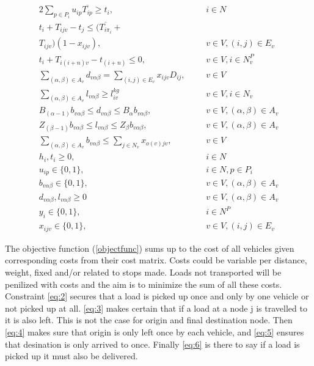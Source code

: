 \documentclass[a4paper,10pt]{article}
\begin{document}
\begin{alignat} {2}
    \sum_{p\in P_i} u_{ip}\overline{T_{ip}} \geq t_{i},			& 	&& 	i \in N 					\label{eq:18}	\\[4pt]
    t_{i} + T_{ijv} - t_{j} \leq (\overline{T_{i\pi_i}} + 		& 	&&						\nonumber\\
    T_{ijv})(1 - x_{ijv}),						& 	&& 	v \in V, (i,j) \in E_v				\label{eq:19}	\\[8pt]
    t_{i} + T_{i(i+n)v} - t_{(i+n)} \leq 0,				& 	&& 	v \in V, i \in N_v^P				\label{eq:20}	\\[8pt]
    \sum_{(\alpha,\beta)\in A_v}d_{v\alpha\beta} = 
    \sum_{(i,j) \in E_v} x_{ijv}D_{ij},					& 	&&	v \in V						\label{eq:21}	\\[4pt]
    \sum_{(\alpha,\beta) \in A_v} l_{v\alpha\beta} \geq l_{iv}^{kg}	&	&& 	v \in V, i \in N_v				\label{eq:22}	\\[4pt]
    B_{(\alpha-1)}b_{v\alpha\beta} \leq d_{v\alpha\beta} \leq 
    B_\alpha b_{v\alpha\beta},				        	& 	&&	v \in V, (\alpha, \beta) \in A_v		\label{eq:23}	\\[8pt]
    Z_{(\beta-1)}b_{v\alpha\beta} \leq l_{v\alpha\beta} \leq 
    Z_\beta b_{v\alpha\beta},				        	& 	&&	v \in V, (\alpha, \beta) \in A_v		\label{eq:24}	\\[8pt]   	
    \sum_{(\alpha, \beta) \in A_v} b_{v\alpha\beta} \leq		
    \sum_{j\in N_v}x_{o(v)jv},                                          & 	&&	v \in V						\label{eq:25}	\\[4pt]
    h_i, t_i \geq 0,							& 	&&	i \in N 					\label{eq:26}	\\[8pt]
    u_{ip} \in \{0, 1\},						& 	&&	i \in N, p \in P_i 				\label{eq:27}	\\[8pt]
    b_{v\alpha\beta} \in \{0, 1\},					& 	&&	v \in V, (\alpha,\beta) \in A_v 		\label{eq:28}	\\[8pt]
    d_{v\alpha\beta}, l_{v\alpha\beta} \geq 0                           &       &&      v \in V, (\alpha,\beta) \in A_v 		\label{eq:29}	\\[8pt]
    y_i \in \{0, 1\},                                                   &       &&      i \in N^P                                       \label{eq:30}   \\[8pt]
    x_{ijv} \in \{0, 1\},						&	&&	v \in V, (i, j) \in E_v 			\label{eq:31}
\end{alignat} 
\endgroup

\par
The objective function (\ref{objectfunc}) sums up to the cost of all vehicles given corresponding costs from their cost matrix. Costs could be variable per distance, weight, fixed and/or related to stops made. Loads not transported will be penilized with costs and the aim is to minimize the sum of all these costs.
Constraint \ref{eq:2} secures that a load is picked up once and only by one vehicle or not picked up at all. 
\ref{eq:3} makes certain that if a load at a node j is travelled to it is also left. This is not the case for origin and final destination node.
Then \ref{eq:4} makes sure that origin is only left once by each vehicle, 
and \ref{eq:5} ensures that desination is only arrived to once.
Finally \ref{eq:6} is there to say if a load is picked up it must also be delivered. \par
\end{document}
